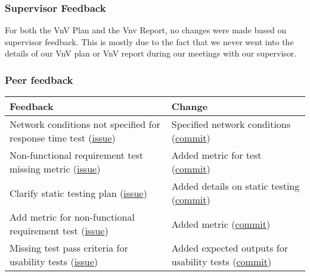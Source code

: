 \documentclass{article}
\begin{document}
\subsubsection{Supervisor Feedback}
For both the VnV Plan and the Vnv Report, no changes were made based on supervisor feedback. This is mostly due to the fact that we never went into the details of our VnV plan or VnV report during our meetings with our supervisor.
\subsubsection{Peer feedback}
\begin{tabularx}{\textwidth}{X|X}
    \toprule
    \textbf{Feedback} & \textbf{Change}\\
    \midrule
    Network conditions not specified for response time test (\href{https://github.com/AidanMariglia/SOCAlgoTestPlatform/issues/148}{issue}) & Specified network conditions (\href{https://github.com/AidanMariglia/SOCAlgoTestPlatform/commit/ec457baf842a25adfbe6afd6593c72337a88b924}{commit}) \\
    \midrule
    Non-functional requirement test missing metric (\href{https://github.com/AidanMariglia/SOCAlgoTestPlatform/issues/147}{issue}) & Added metric for test (\href{https://github.com/AidanMariglia/SOCAlgoTestPlatform/commit/0804fed4010c6e8a2efc4ad89dca797c9b3e6734}{commit}) \\
    \midrule
    Clarify static testing plan (\href{https://github.com/AidanMariglia/SOCAlgoTestPlatform/issues/30}{issue}) & Added details on static testing (\href{https://github.com/AidanMariglia/SOCAlgoTestPlatform/commit/2cb2cc7b86ce80acf9f0f7ae8ebed7ea63a70457#diff-8d3e9ddbf3d26cf5e2a7027bf962071598c6f3916127fdabcb800f03d22ba969R176}{commit}) \\
    \midrule
    Add metric for non-functional requirement test (\href{https://github.com/AidanMariglia/SOCAlgoTestPlatform/issues/23}{issue}) & Added metric (\href{https://github.com/AidanMariglia/SOCAlgoTestPlatform/commit/2cb2cc7b86ce80acf9f0f7ae8ebed7ea63a70457#diff-8d3e9ddbf3d26cf5e2a7027bf962071598c6f3916127fdabcb800f03d22ba969L574-R583}{commit}) \\
    \midrule
    Missing test pass criteria for usability tests (\href{https://github.com/AidanMariglia/SOCAlgoTestPlatform/issues/144}{issue}) & Added expected outputs for usability tests (\href{https://github.com/AidanMariglia/SOCAlgoTestPlatform/commit/3dec507969b2e49a65448feeb9fab293a89bd27c}{commit}) \\

\end{tabularx}
\end{document}
